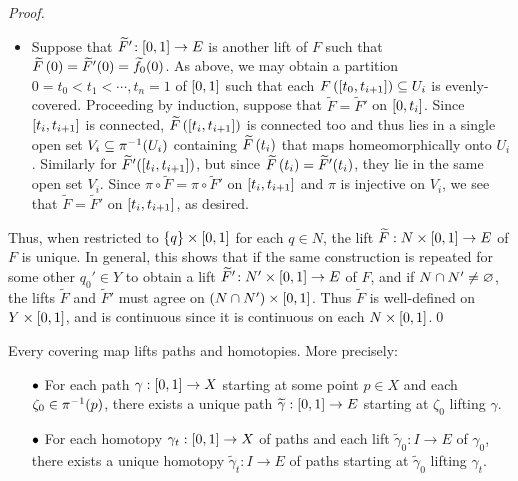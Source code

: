 \documentclass[../Moduli_Spaces_of_Riemann_Surfaces.tex]{subfiles}
\begin{document}
\begin{proof}
\begin{itemize}
            \item Suppose that $\widetilde{F}'\!:\l[0,1\r]\to E$ is another lift of $F$ such that $\widetilde{F}\l(0\r)=\widetilde{F}'\!\l(0\r)=\widetilde{f}_0\!\l(0\r)$. As above, we may obtain a partition $0=t_0<t_1<\cdots,t_n=1$ of $\l[0,1\r]$ such that each $F\l(\l[t_0,t_{i+1}\r]\r)\subseteq U_i$ is evenly-covered. Proceeding by induction, suppose that $\widetilde{F}=\widetilde{F}'$ on $\l[0,t_i\r]$. Since $\l[t_i,t_{i+1}\r]$ is connected, $\widetilde{F}\l(\l[t_i,t_{i+1}\r]\r)$ is connected too and thus lies in a single open set $V_i\subseteq\pi^{-1}\!\l(U_i\r)$ containing $\widetilde{F}\l(t_i\r)$ that maps homeomorphically onto $U_i$. Similarly for $\widetilde{F}'\!\l(\l[t_i,t_{i+1}\r]\r)$, but since $\widetilde{F}\l(t_i\r)=\widetilde{F}'\!\l(t_i\r)$, they lie in the same open set $V_i$. Since $\pi\circ\widetilde{F}=\pi\circ\widetilde{F}'$ on $\l[t_i,t_{i+1}\r]$ and $\pi$ is injective on $V_i$, we see that $\widetilde{F}=\widetilde{F}'$ on $\l[t_i,t_{i+1}\r]$, as desired.
        \end{itemize}
        Thus, when restricted to $\l\{q\r\}\times\l[0,1\r]$ for each $q\in N$, the lift $\widetilde{F}:N\times\l[0,1\r]\to E$ of $F$ is unique. In general, this shows that if the same construction is repeated for some other $q_0'\in Y$ to obtain a lift $\widetilde{F}'\!:N'\times\l[0,1\r]\to E$ of $F$, and if $N\cap N'\neq\em$, the lifts $\widetilde{F}$ and $\widetilde{F}'$ must agree on $\l(N\cap N'\r)\times\l[0,1\r]$. Thus $\widetilde{F}$ is well-defined on $Y\times\l[0,1\r]$, and is continuous since it is continuous on each $N\times\l[0,1\r]$.\qed
    \end{proof}
    \begin{corollary}\label{CS:cor:lift_curve_homotopy}
        Every covering map lifts paths and homotopies. More precisely:
        \begin{itemize}
            \item[$\blob$] For each path $\gamma:\l[0,1\r]\to X$ starting at some point $p\in X$ and each $\zeta_0\in\pi^{-1}\!\l(p\r)$, there exists a unique path $\widetilde{\gamma}:\l[0,1\r]\to E$ starting at $\zeta_0$ lifting $\gamma$.
                \vspace{-0.05in}
            \item[$\blob$] For each homotopy $\gamma_t:\l[0,1\r]\to X$ of paths and each lift $\widetilde{\gamma}_0:I\to E$ of $\gamma_0$, there exists a unique homotopy $\widetilde{\gamma}_t:I\to E$ of paths starting at $\widetilde{\gamma}_0$ lifting $\gamma_t$.
        \end{itemize}
    \end{corollary}
\end{document}
